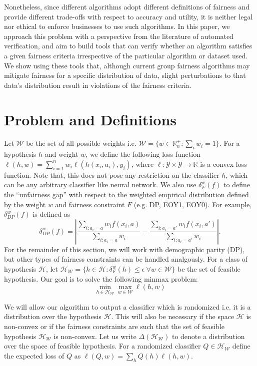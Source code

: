\documentclass{article}
\newcommand{\set}[1]{\{#1\}}
\newcommand{\bbR}{\mathbb{R}}
\newcommand{\WW}{\mathcal{W}}
\newcommand{\abs}[1]{\left|#1\right|}
\newcommand{\HH}{\mathcal{H}}
\newcommand{\YY}{\mathcal{Y}}
\begin{document}
Nonetheless, since different algorithms adopt different definitions of fairness and provide different trade-offs with respect to accuracy and utility, it is neither legal nor ethical to enforce businesses to use such algorithms. In this paper, we approach this problem with a perspective from the literature of automated verification, and aim to build tools that can verify whether an algorithm satisfies a given fairness criteria irrespective of the particular algorithm or dataset used. We show using these tools that, although current group fairness algorithms may mitigate fairness for a specific distribution of data, slight perturbations to that data's distribution result in violations of the fairness criteria. 

\section{Problem and Definitions}


Let $\WW$ be the set of all possible weights i.e. $\WW = \set{w \in \bbR^+_n : \sum_i w_i = 1}$. For a hypothesis $h$ and weight $w$, we define the following loss function $\ell(h,w) = \sum_{i=1}^n w_i \ell(h(x_i,a_i), y_i)$, where $\ell: \YY \times \YY \rightarrow \bbR$ is a convex loss function. Note that, this does not pose any restriction on the classifier $h$, which can be any arbitrary classifier like neural network. We also use $\delta_F^w(f)$ to define the ``unfairness gap'' with respect to the weighted empirical distribution defined by the weight $w$ and fairness constraint $F$ (e.g. DP, EOY1, EOY0). For example, $\delta^w_{DP}(f)$ is defined as
$$\delta^w_{DP}(f) = \abs{ \frac{\sum_{i: a_i = a} w_i f(x_i,a)}{\sum_{i: a_i = a} w_i} -  \frac{\sum_{i: a_i = a'} w_i f(x_i,a')}{{\sum_{i: a_i = a'} w_i}} }.$$ For the remainder of this section, we will work with demographic parity (DP), but other types of fairness constraints can be handled analgously.
For a class of hypothesis $\HH$, let $\HH_{\WW} = \set{h \in \HH: \delta^w_F(h) \le \epsilon\ \forall w \in \WW}$ be the set of feasible hypothesis. 
Our goal is to solve the following minmax problem:
\begin{equation}\label{eq:det-wt-classification}
\min_{h \in {\HH}_{\WW} } \max_{w \in \WW} \ell(h,w) 
\end{equation}

We will allow our algorithm to output a classifier which is randomized i.e. it is a distribution over the hypothesis $\HH$. This will also be necessary if the space $\HH$ is non-convex or if the fairness constraints are such that the set of feasible hypothesis $\HH_{\WW}$ is non-convex. Let us write $\Delta(\HH_{\WW})$ to denote a distribution over the space of feasible hypothesis. For a randomized classifier $Q \in \HH_{\WW}$ define the expected loss of $Q$ as $\ell(Q,w) = \sum_{h} Q(h) \ell(h,w)$. 
\end{document}
